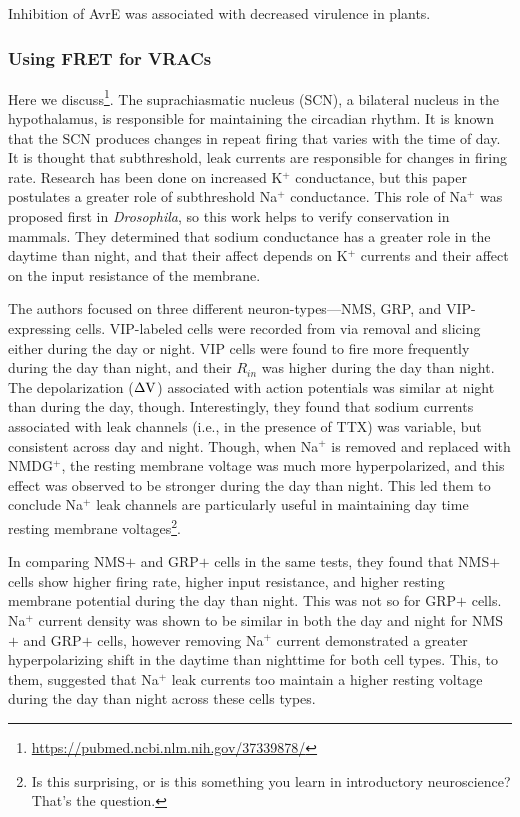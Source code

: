 \documentclass[12pt]{report}
\newcommand{\V}{{\rm V}}
\begin{document}
Inhibition of AvrE was associated with decreased virulence in plants. 

\subsubsection{Using FRET for VRACs}

Here we discuss\footnote{\url{https://pubmed.ncbi.nlm.nih.gov/37339878/}}. The suprachiasmatic nucleus (SCN), a bilateral nucleus in the hypothalamus, is responsible for maintaining the circadian rhythm. It is known that the SCN produces changes in repeat firing that varies with the time of day. It is thought that subthreshold, leak currents are responsible for changes in firing rate. Research has been done on increased K$^+$ conductance, but this paper postulates a greater role of subthreshold Na$^+$ conductance. This role of Na$^+$ was proposed first in \textit{Drosophila}, so this work helps to verify conservation in mammals. They determined that sodium conductance has a greater role in the daytime than night, and that their affect depends on K$^+$ currents and their affect on the input resistance of the membrane.\newline

The authors focused on three different neuron-types---NMS, GRP, and VIP-expressing cells. VIP-labeled cells were recorded from via removal and slicing either during the day or night. VIP cells were found to fire more frequently during the day than night, and their $R_{in}$ was higher during the day than night. The depolarization ($\Delta \V$) associated with action potentials was similar at night than during the day, though. Interestingly, they found that sodium currents associated with leak channels (i.e., in the presence of TTX) was variable, but consistent across day and night. Though, when Na$^+$ is removed and replaced with NMDG$^+$, the resting membrane voltage was much more hyperpolarized, and this effect was observed to be stronger during the day than night. This led them to conclude Na$^+$ leak channels are particularly useful in maintaining day time resting membrane voltages\footnote{Is this surprising, or is this something you learn in introductory neuroscience? That's the question.}.\newline

In comparing NMS$+$ and GRP$+$ cells in the same tests, they found that NMS$+$ cells show higher firing rate, higher input resistance, and higher resting membrane potential during the day than night. This was not so for GRP$+$ cells. Na$^+$ current density was shown to be similar in both the day and night for NMS$+$ and GRP$+$ cells, however removing Na$^+$ current demonstrated a greater hyperpolarizing shift in the daytime than nighttime for both cell types. This, to them, suggested that Na$^+$ leak currents too maintain a higher resting voltage during the day than night across these cells types. 
\end{document}

